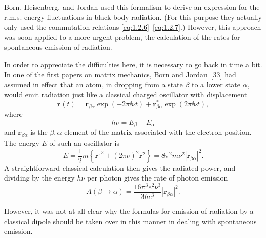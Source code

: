 Born, Heisenberg, and Jordan used this formalism to derive an expression for
the r.m.s. energy fluctuations in black-body radiation. (For this purpose they
actually only used the commutation relations \eqref{eq:1.2.6}--\eqref{eq:1.2.7}.) However, this
approach was soon applied to a more urgent problem, the calculation of the
rates for spontaneous emission of radiation.

In order to appreciate the difficulties here, it is necessary to go back in
time a bit. In one of the first papers on matrix mechanics, Born and Jordan~\hyperref[ref:1.33]{[33]}
had assumed in effect that an atom, in dropping from a state $\beta$ to a lower
state $\alpha$, would emit radiation just like a classical charged oscillator
with displacement
\begin{equation}
  \mathbf r(t)=\mathbf r_{\beta\alpha}\exp(-2\pi \ii\nu t)
    +\mathbf r_{\beta\alpha}^{*}\exp(2\pi \ii\nu t),
  \tag{1.2.16}\label{eq:1.2.16}
\end{equation}
where
\begin{equation}
  h\nu=E_{\beta}-E_{\alpha}
  \tag{1.2.17}\label{eq:1.2.17}
\end{equation}
and $\mathbf r_{\beta\alpha}$ is the $\beta,\alpha$ element of the matrix
associated with the electron position. The energy $E$ of such an oscillator is
\begin{equation}
  E=\frac12m\left\{\dot{\mathbf r}^{,2}+(2\pi\nu)^2\mathbf r^2\right\}
   =8\pi^2m\nu^2|\mathbf r_{\beta\alpha}|^2.
  \tag{1.2.18}\label{eq:1.2.18}
\end{equation}
A straightforward classical calculation then gives the radiated power, and
dividing by the energy $h\nu$ per photon gives the rate of photon emission
\begin{equation}
  A(\beta\to\alpha)
  =\frac{16\pi^3e^2\nu^3}{3hc^3}|\mathbf r_{\beta\alpha}|^2.
  \tag{1.2.19}\label{eq:1.2.19}
\end{equation}

However, it was not at all clear why the formulas for emission of radiation
by a classical dipole should be taken over in this manner in dealing with
spontaneous emission.

